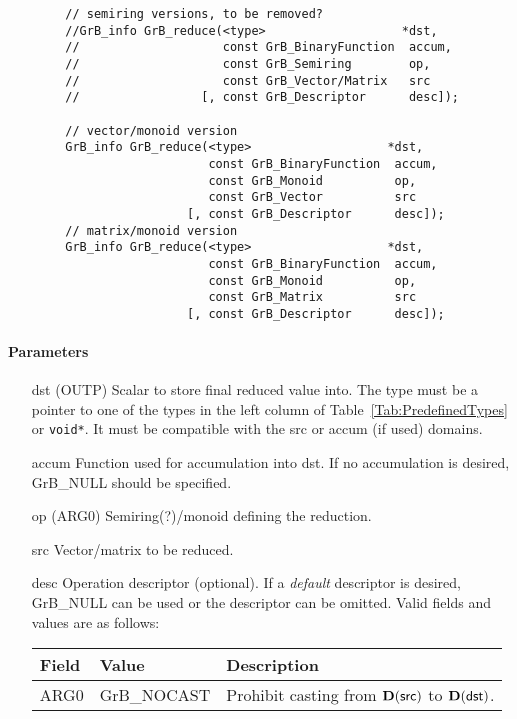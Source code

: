 \begin{verbatim}
        // semiring versions, to be removed?
        //GrB_info GrB_reduce(<type>                   *dst,
        //                    const GrB_BinaryFunction  accum,
        //                    const GrB_Semiring        op,
        //                    const GrB_Vector/Matrix   src
        //                 [, const GrB_Descriptor      desc]);
                         
        // vector/monoid version
        GrB_info GrB_reduce(<type>                   *dst,
                            const GrB_BinaryFunction  accum,
                            const GrB_Monoid          op,
                            const GrB_Vector          src
                         [, const GrB_Descriptor      desc]);
        // matrix/monoid version
        GrB_info GrB_reduce(<type>                   *dst,
                            const GrB_BinaryFunction  accum,
                            const GrB_Monoid          op,
                            const GrB_Matrix          src
                         [, const GrB_Descriptor      desc]);
\end{verbatim}


\paragraph{Parameters}

\begin{itemize}[leftmargin=1.1in]
    \item[{\sf dst}]    ({\sf OUTP}) Scalar to store final reduced value into.  The type must be
                        a pointer to one of the types in the left column of 
                        Table~\ref{Tab:PredefinedTypes} or {\tt void*}. It must be
                        compatible with the {\sf src} or {\sf accum} (if used) domains.

    \item[{\sf accum}]  Function used for accumulation into {\sf dst}.  If no accumulation
                        is desired, {\sf GrB\_NULL} should be specified.

    \item[{\sf op}]     ({\sf ARG0}) Semiring(?)/monoid defining the reduction.
    \item[{\sf src}]    Vector/matrix to be reduced.

    \item[{\sf desc}]   Operation descriptor (optional). If a
    \emph{default} descriptor is desired, {\sf GrB\_NULL} can be
    used or the descriptor can be omitted.  Valid fields and values are as follows: \\
    \begin{tabular}{lll}
    Field  & Value & Description \\
    \hline
    {\sf ARG0} & {\sf GrB\_NOCAST} & Prohibit casting from $\bold{D}({\sf src})$ to 
    $\bold{D}({\sf dst})$.  \\
    \end{tabular}\\
\end{itemize}

